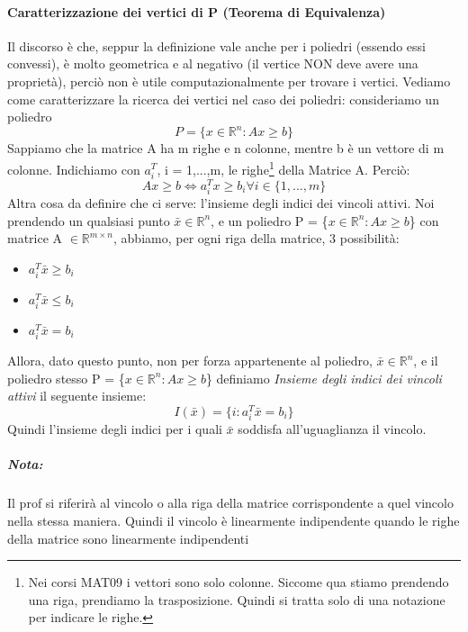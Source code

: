 \paragraph{Caratterizzazione dei vertici di P (Teorema di Equivalenza)} 
Il discorso è che, seppur la definizione vale anche per i poliedri (essendo essi convessi), è molto geometrica e al negativo (il vertice NON deve avere una proprietà), perciò non è utile computazionalmente per trovare i vertici. Vediamo come caratterizzare la ricerca dei vertici nel caso dei poliedri: consideriamo un poliedro
\begin{equation*}
    P = \{x \in \mathbb{R}^n: Ax \geq b\}
\end{equation*}
Sappiamo che la matrice A ha m righe e n colonne, mentre b è un vettore di m colonne. Indichiamo con $a_i^T$, i = 1,...,m, le righe\footnote{Nei corsi MAT09 i vettori sono solo colonne. Siccome qua stiamo prendendo una riga, prendiamo la trasposizione. Quindi si tratta solo di una notazione per indicare le righe.} della Matrice A. Perciò:
\begin{equation*}
    Ax \geq b \Longleftrightarrow a_i^Tx \geq b_i \forall i \in \{1,...,m\}
\end{equation*}
Altra cosa da definire che ci serve: l'insieme degli indici dei vincoli attivi. Noi prendendo un qualsiasi punto $\bar{x} \in \mathbb{R}^n$, e un poliedro P = \{$x \in \mathbb{R}^n: Ax \geq b$\} con matrice A $\in \mathbb{R}^{m\times n}$, abbiamo, per ogni riga della matrice, 3 possibilità:
\begin{itemize}
    \item $a_i^T\bar{x} \geq b_i$
    \item $a_i^T\bar{x} \leq b_i$
    \item $a_i^T\bar{x} = b_i$
\end{itemize}
Allora, dato questo punto, non per forza appartenente al poliedro, $\bar{x} \in \mathbb{R}^n$, e il poliedro stesso P = \{$x \in \mathbb{R}^n: Ax \geq b$\} definiamo \textit{Insieme degli indici dei vincoli attivi} il seguente insieme:
\begin{equation*}
    I(\bar{x}) = \{i: a_i^T\bar{x} = b_i\}
\end{equation*}
Quindi l'insieme degli indici per i quali $\bar{x}$ soddisfa all'uguaglianza il vincolo. 

\subparagraph{Nota:} Il prof si riferirà al vincolo o alla riga della matrice corrispondente a quel vincolo nella stessa maniera. Quindi il vincolo è linearmente indipendente quando le righe della matrice sono linearmente indipendenti


